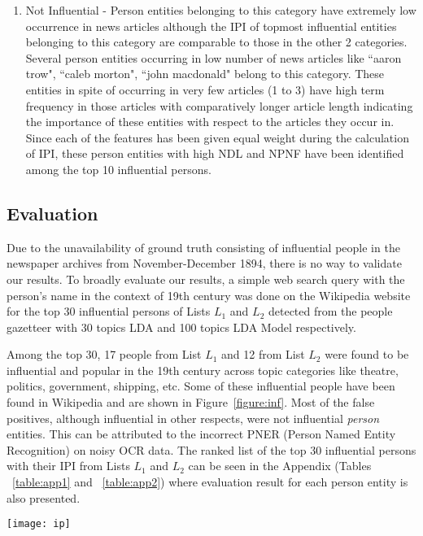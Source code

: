 \begin{enumerate}
\item
Not Influential - Person entities belonging to this category have extremely low occurrence in news articles although the IPI of topmost influential entities belonging to this category are comparable to those in the other 2 categories.
Several person entities occurring in low number of news articles like ``aaron trow", ``caleb morton", ``john macdonald"  belong to this category. These entities in spite of occurring in very few articles (1 to 3) have high term frequency in those articles with comparatively longer article length indicating the importance of these entities with respect to the articles they occur in. Since each of the features has been given equal weight during the calculation of IPI,  these person entities with high NDL and NPNF have been identified among the top 10 influential persons. 
\end{enumerate} 


\subsection{Evaluation}

Due to the unavailability of ground truth consisting of influential people in the newspaper archives from November-December 1894, there is no way to validate our results. 
To broadly evaluate our results, a simple web search query with the person's name in the context of 19th century was done on the Wikipedia website for the top 30 influential persons of Lists $L_1$ and $L_2$ detected from the people gazetteer with 30 topics LDA and 100 topics LDA Model respectively.

Among the top 30, 17 people from List $L_1$ and 12 from List $L_2$ were found to be influential and popular in the 19th century across topic categories like theatre, politics, government, shipping, etc. Some of these influential people have been found in Wikipedia and are shown in Figure~\ref{figure:inf}. Most of the false positives, although influential in other respects, were not  influential \emph{person} entities. This can be attributed to the incorrect PNER (Person Named Entity Recognition) on noisy OCR data. The ranked list of the top 30 influential persons with their IPI from Lists $L_1$ and $L_2$ can be seen in the Appendix (Tables ~\ref{table:app1} and ~\ref{table:app2}) where evaluation result for each person entity is also presented.


\begin{figure*}
\begin{center}
\texttt{[image: ip]}
\caption{Some of the top 30 influential persons obtained from the dataset and also found on Wikipedia during evaluation}
\label{figure:inf}
\vspace*{-10pt}

\end{center}
\end{figure*}


